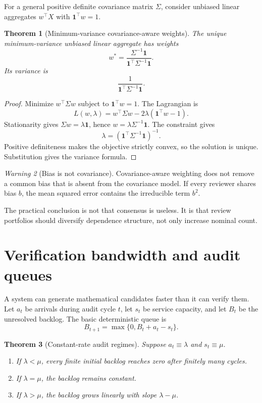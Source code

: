 \documentclass[11pt,oneside]{article}
\newtheorem{theorem}{Theorem}[section]
\theoremstyle{definition}
\theoremstyle{remark}
\newtheorem{warning}[theorem]{Warning}
\begin{document}
For a general positive definite covariance matrix $\Sigma$, consider unbiased linear aggregates $w^\top X$ with $\mathbf 1^\top w=1$.

\begin{theorem}[Minimum-variance covariance-aware weights]
The unique minimum-variance unbiased linear aggregate has weights
\[
w^*
=
\frac{\Sigma^{-1}\mathbf 1}
{\mathbf 1^\top\Sigma^{-1}\mathbf 1}.
\]
Its variance is
\[
\frac{1}{\mathbf 1^\top\Sigma^{-1}\mathbf 1}.
\]
\end{theorem}

\begin{proof}
Minimize $w^\top\Sigma w$ subject to $\mathbf 1^\top w=1$. The Lagrangian is
\[
L(w,\lambda)=w^\top\Sigma w-2\lambda(\mathbf 1^\top w-1).
\]
Stationarity gives $\Sigma w=\lambda\mathbf 1$, hence $w=\lambda\Sigma^{-1}\mathbf 1$. The constraint gives
\[
\lambda=(\mathbf 1^\top\Sigma^{-1}\mathbf 1)^{-1}.
\]
Positive definiteness makes the objective strictly convex, so the solution is unique. Substitution gives the variance formula.
\end{proof}

\begin{warning}[Bias is not covariance]
Covariance-aware weighting does not remove a common bias that is absent from the covariance model. If every reviewer shares bias $b$, the mean squared error contains the irreducible term $b^2$.
\end{warning}

The practical conclusion is not that consensus is useless. It is that review portfolios should diversify dependence structure, not only increase nominal count.

\section{Verification bandwidth and audit queues}

A system can generate mathematical candidates faster than it can verify them. Let $a_t$ be arrivals during audit cycle $t$, let $s_t$ be service capacity, and let $B_t$ be the unresolved backlog. The basic deterministic queue is
\[
B_{t+1}=\max\{0,B_t+a_t-s_t\}.
\]

\begin{theorem}[Constant-rate audit regimes]
\label{thm:audit-rates}
Suppose $a_t\equiv\lambda$ and $s_t\equiv\mu$.
\begin{enumerate}[label=\textup{(\roman*)}]
\item If $\lambda<\mu$, every finite initial backlog reaches zero after finitely many cycles.
\item If $\lambda=\mu$, the backlog remains constant.
\item If $\lambda>\mu$, the backlog grows linearly with slope $\lambda-\mu$.
\end{enumerate}
\end{theorem}
\end{document}
